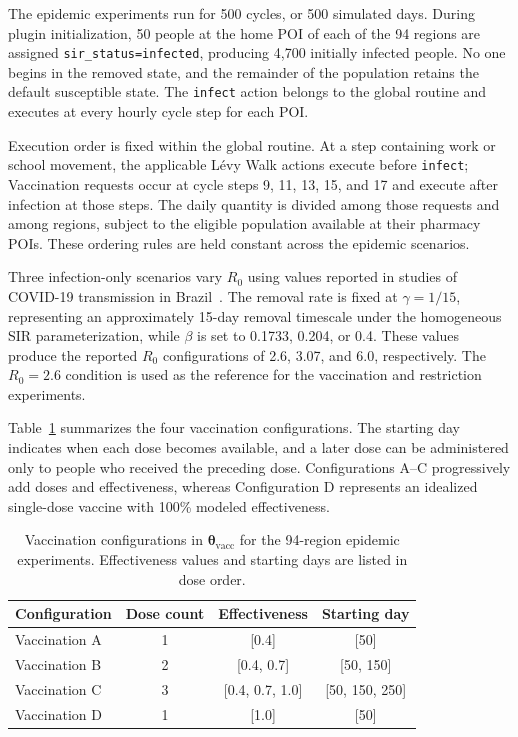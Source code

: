 The epidemic experiments run for 500 cycles, or 500 simulated days. During plugin initialization, 50 people at the home POI of each of the 94 regions are assigned \texttt{sir\_status=infected}, producing 4,700 initially infected people. No one begins in the removed state, and the remainder of the population retains the default susceptible state. The \texttt{infect} action belongs to the global routine and executes at every hourly cycle step for each POI.

Execution order is fixed within the global routine. At a step containing work or school movement, the applicable L\'evy Walk actions execute before \texttt{infect};%
Vaccination requests occur at cycle steps 9, 11, 13, 15, and 17 and execute after infection at those steps. The daily quantity is divided among those requests and among regions, subject to the eligible population available at their pharmacy POIs. These ordering rules are held constant across the epidemic scenarios.

Three infection-only scenarios vary $R_0$ using values reported in studies of COVID-19 transmission in Brazil~\cite{dutra2020covidR0,deSouza2020covirR0,dutra2021covidR0}. The removal rate is fixed at $\gamma=1/15$, representing an approximately 15-day removal timescale under the homogeneous SIR parameterization, while $\beta$ is set to 0.1733, 0.204, or 0.4. These values produce the reported $R_0$ configurations of 2.6, 3.07, and 6.0, respectively. The $R_0=2.6$ condition is used as the reference for the vaccination and restriction experiments.

Table~\ref{tbl:vaccine_configuration_94} summarizes the four vaccination configurations. The starting day indicates when each dose becomes available, and a later dose can be administered only to people who received the preceding dose. Configurations A--C progressively add doses and effectiveness, whereas Configuration D represents an idealized single-dose vaccine with 100\% modeled effectiveness.

\begin{table}[ht]
\centering
\caption{Vaccination configurations in $\bm{\theta}_{\mathrm{vacc}}$ for the 94-region epidemic experiments. Effectiveness values and starting days are listed in dose order.}
\label{tbl:vaccine_configuration_94}
\begin{tabular}{@{}lccc@{}}
\toprule
\textbf{Configuration} & \textbf{Dose count} & \textbf{Effectiveness} & \textbf{Starting day} \\
\midrule
Vaccination A & 1 & [0.4] & [50] \\
Vaccination B & 2 & [0.4, 0.7] & [50, 150] \\
Vaccination C & 3 & [0.4, 0.7, 1.0] & [50, 150, 250] \\
Vaccination D & 1 & [1.0] & [50] \\
\bottomrule
\end{tabular}
\end{table}

